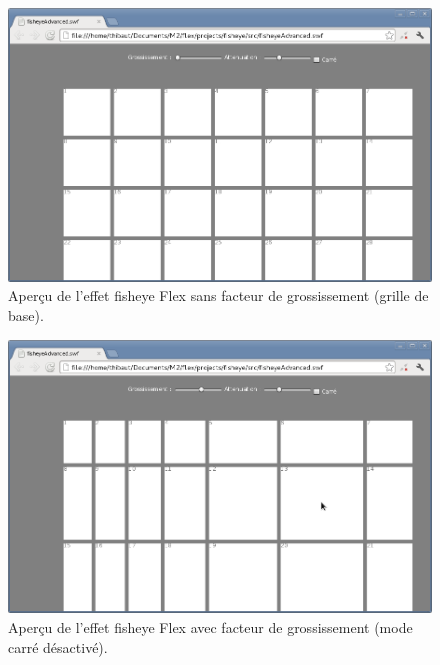\begin{figure}[H]
  \centering
  \includegraphics[width=\textwidth]{../resources/illustrations/flex_screen_1}
  \caption{Aperçu de l'effet fisheye Flex sans facteur de grossissement (grille de base).}
  \label{fig:js_6}
\end{figure}
\begin{minipage}[H]{.5\textwidth}
\begin{figure}[H]
  \centering
  \includegraphics[width=\textwidth]{../resources/illustrations/flex_screen_2}
  \caption{Aperçu de l'effet fisheye Flex avec facteur de grossissement (mode carré désactivé).}
  \label{fig:js_6}
\end{figure}
\end{minipage}
